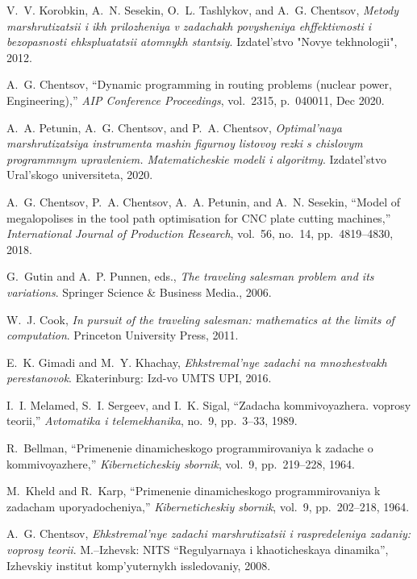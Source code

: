 \begin{thebibliography}{10}

V.~V. Korobkin, A.~N. Sesekin, O.~L. Tashlykov, and A.~G. Chentsov, {\em Metody
  marshrutizatsii i ikh prilozheniya v zadachakh povysheniya ehffektivnosti i
  bezopasnosti ehkspluatatsii atomnykh stantsiy}.
\newblock Izdatel'stvo "Novye tekhnologii", 2012.

A.~G. Chentsov, ``{Dynamic programming in routing problems (nuclear power,
  Engineering)},'' {\em AIP Conference Proceedings}, vol.~2315, p.~040011, Dec
  2020.

A.~A. Petunin, A.~G. Chentsov, and P.~A. Chentsov, {\em Optimal'naya
  marshrutizatsiya instrumenta mashin figurnoy listovoy rezki s chislovym
  programmnym upravleniem. Matematicheskie modeli i algoritmy}.
\newblock Izdatel'stvo Ural'skogo universiteta, 2020.

A.~G. Chentsov, P.~A. Chentsov, A.~A. Petunin, and A.~N. Sesekin, ``Model of
  megalopolises in the tool path optimisation for {CNC} plate cutting
  machines,'' {\em International Journal of Production Research}, vol.~56,
  no.~14, pp.~4819--4830, 2018.

G.~Gutin and A.~P. Punnen, eds., {\em The traveling salesman problem and its
  variations}.
\newblock Springer Science \& Business Media., 2006.

W.~J. Cook, {\em In pursuit of the traveling salesman: mathematics at the
  limits of computation}.
\newblock Princeton University Press, 2011.

E.~K. Gimadi and M.~Y. Khachay, {\em Ehkstremal'nye zadachi na mnozhestvakh
  perestanovok}.
\newblock Ekaterinburg: Izd-vo UMTS UPI, 2016.

I.~I. Melamed, S.~I. Sergeev, and I.~K. Sigal, ``Zadacha kommivoyazhera.
  voprosy teorii,'' {\em Avtomatika i telemekhanika}, no.~9, pp.~3--33, 1989.

R.~Bellman, ``Primenenie dinamicheskogo programmirovaniya k zadache o
  kommivoyazhere,'' {\em Kiberneticheskiy sbornik}, vol.~9, pp.~219--228, 1964.

M.~Kheld and R.~Karp, ``Primenenie dinamicheskogo programmirovaniya k zadacham
  uporyadocheniya,'' {\em Kiberneticheskiy sbornik}, vol.~9, pp.~202--218,
  1964.

A.~G. Chentsov, {\em Ehkstremal'nye zadachi marshrutizatsii i raspredeleniya
  zadaniy: voprosy teorii}.
\newblock M.--Izhevsk: NITS ``Regulyarnaya i khaoticheskaya dinamika'',
  Izhevskiy institut komp'yuternykh issledovaniy, 2008.


\end{thebibliography}
